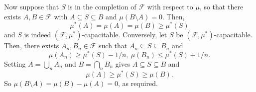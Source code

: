 \documentclass[12pt]{article}
\begin{document}
Now suppose that $S$ is in the completion of $\mathcal{F}$ with respect to $\mu$, so that there exists $A,B\in\mathcal{F}$ with $A\subseteq S\subseteq B$ and $\mu(B\setminus A)=0$. Then,
\begin{equation*}
\mu^*(A)=\mu(A)=\mu(B)\ge\mu^*(S)
\end{equation*}
and $S$ is indeed $(\mathcal{F},\mu^*)$-capacitable.
Conversely, let $S$ be $(\mathcal{F},\mu^*)$-capacitable. Then, there exists $A_n,B_n\in\mathcal{F}$ such that $A_n\subseteq S\subseteq B_n$ and
\begin{equation*}
\mu(A_n)\ge\mu^*(S)-1/n,\ \mu(B_n)\le\mu^*(S)+1/n.
\end{equation*}
Setting $A=\bigcup_nA_n$ and $B=\bigcap_nB_n$ gives $A\subseteq S\subseteq B$ and
\begin{equation*}
\mu(A)\ge\mu^*(S)\ge\mu(B).
\end{equation*}
So $\mu(B\setminus A)=\mu(B)-\mu(A)=0$, as required.

\end{document}
